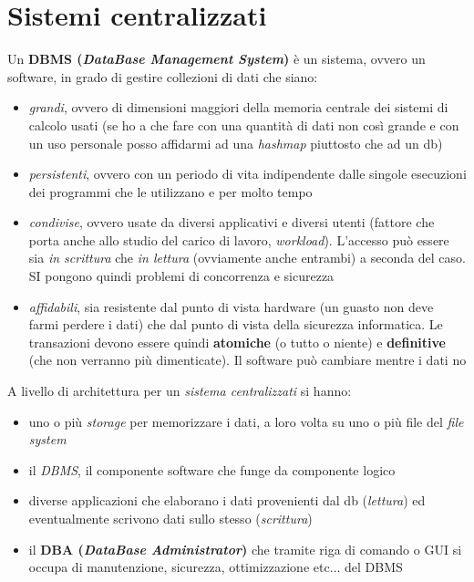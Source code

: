 \documentclass[a4paper,12pt, oneside]{book}
\begin{document}
\chapter{Sistemi centralizzati}
\begin{definizione}
  Un \textbf{DBMS (\textit{DataBase Management System})} è un sistema, ovvero un
  software, in grado di gestire collezioni di dati che siano:
  \begin{itemize}
    \item \textit{grandi}, ovvero di dimensioni maggiori della memoria centrale
    dei sistemi di calcolo usati (se ho a che fare con una quantità di dati non
    così grande e con un uso personale posso affidarmi ad una \textit{hashmap}
    piuttosto che ad un db)
    \item \textit{persistenti}, ovvero con un periodo di vita indipendente dalle
    singole esecuzioni dei programmi che le utilizzano e per molto tempo 
    \item \textit{condivise}, ovvero usate da diversi applicativi e diversi
    utenti (fattore che porta anche allo studio del carico di lavoro,
    \textit{workload}). L'accesso può essere sia \textit{in scrittura} che
    \textit{in lettura} (ovviamente anche entrambi) a seconda del caso. SI
    pongono quindi problemi di concorrenza e sicurezza
    \item \textit{affidabili}, sia resistente dal punto di vista hardware (un
    guasto non deve farmi perdere i dati) che dal punto di vista della sicurezza
    informatica. Le transazioni devono essere quindi \textbf{atomiche} (o tutto
    o niente) e \textbf{definitive} (che non verranno più dimenticate). Il
    software può cambiare mentre i dati no
  \end{itemize}
\end{definizione}
A livello di architettura per un \textit{sistema centralizzati} si hanno:
\begin{itemize}
  \item uno o più \textit{storage} per memorizzare i dati, a loro volta su uno o
  più file del \textit{file system}
  \item il \textit{DBMS}, il componente software che funge da componente logico
  \item diverse applicazioni che elaborano i dati provenienti dal db
  (\textit{lettura}) ed eventualmente scrivono dati sullo stesso
  (\textit{scrittura})
  \item il \textbf{DBA (\textit{DataBase Administrator})} che tramite riga di
  comando o GUI si occupa di manutenzione, sicurezza, ottimizzazione etc$\ldots$
  del DBMS 
\end{itemize}
\end{document}
